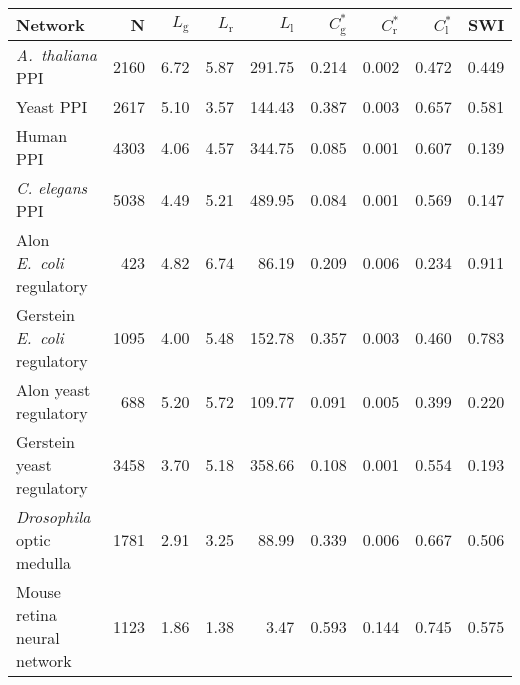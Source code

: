 \begin{tabular}{lrrrrrrrr}
\hline
Network & N  & $L_{\mathrm{g}}$ & $L_{\mathrm{r}}$ & $L_{\mathrm{l}}$ & $C^\ast_{\mathrm{g}}$ & $C^\ast_{\mathrm{r}}$ & $C^\ast_{\mathrm{l}}$ &  SWI \\
\hline
\textit{A.~thaliana} PPI & 2160 & 6.72 & 5.87 & 291.75 & 0.214 & 0.002 & 0.472 & 0.449\\
Yeast PPI & 2617 & 5.10 & 3.57 & 144.43 & 0.387 & 0.003 & 0.657 & 0.581\\
Human PPI & 4303 & 4.06 & 4.57 & 344.75 & 0.085 & 0.001 & 0.607 & 0.139\\
\textit{C. elegans} PPI & 5038 & 4.49 & 5.21 & 489.95 & 0.084 & 0.001 & 0.569 & 0.147\\
Alon \textit{E.~coli} regulatory & 423 & 4.82 & 6.74 & 86.19 & 0.209 & 0.006 & 0.234 & 0.911\\
Gerstein \textit{E.~coli} regulatory & 1095 & 4.00 & 5.48 & 152.78 & 0.357 & 0.003 & 0.460 & 0.783\\
Alon yeast regulatory & 688 & 5.20 & 5.72 & 109.77 & 0.091 & 0.005 & 0.399 & 0.220\\
Gerstein yeast regulatory & 3458 & 3.70 & 5.18 & 358.66 & 0.108 & 0.001 & 0.554 & 0.193\\
\textit{Drosophila} optic medulla & 1781 & 2.91 & 3.25 & 88.99 & 0.339 & 0.006 & 0.667 & 0.506\\
Mouse retina neural network & 1123 & 1.86 & 1.38 & 3.47 & 0.593 & 0.144 & 0.745 & 0.575\\
\hline
\end{tabular}

